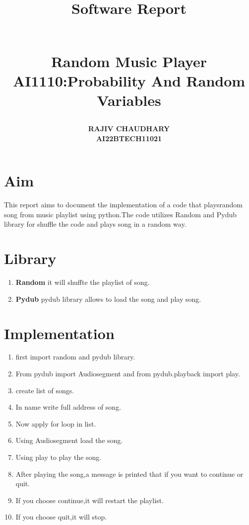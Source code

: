 \documentclass{article}
\title{\begin{Huge}\textbf{Software Report}\end{Huge}\\
        \textbf{Random Music Player}\\
\textbf{AI1110}:Probability And Random Variables}
\author{\textbf{RAJIV CHAUDHARY}\\
\textbf{AI22BTECH11021}}
\date{}
\begin{document}
\maketitle

\section{Aim}
This report aims to document the implementation of a code that playsrandom song from music playlist using python.The code utilizes Random and Pydub library for shuffle the code and plays song in a random way.
\section {Library}
\begin{enumerate}
        \item \textbf{Random} it will shuffte the playlist of song.
        \item \textbf{Pydub} pydub library allows to load the song and play song.
\end{enumerate}
\section{Implementation}
\begin{enumerate}
        \item first import random and pydub library.
        \item From pydub import Audiosegment and from pydub.playback import play.
        \item create list of songs.
        \item In name write full address of song.
        \item Now apply for loop in list.
        \item Using Audiosegment load the song.
        \item Using play to play the song.
        \item After playing the song,a message is printed that if you want to continue or quit.
        \item If you choose continue,it will restart the playlist.
        \item If you choose quit,it will stop.
\end{enumerate}
\end{document}
